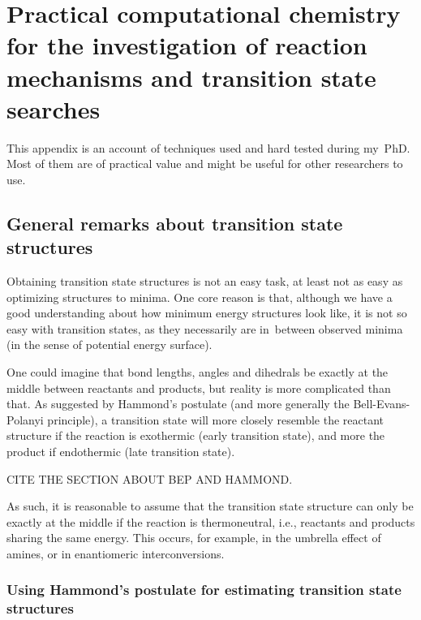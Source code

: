 \chapter{Practical computational chemistry for the investigation of reaction
  mechanisms and transition state searches}%
\label{ch:tutorial}


This appendix is an account of techniques used and hard tested during my~PhD.
Most of them are of practical value and might be useful for other researchers
to use.

\section{General remarks about transition state structures}

Obtaining transition state structures is not an easy task, at least not as easy
as optimizing structures to minima.
One core reason is that, although we have a good understanding about how
minimum energy structures look like, it is not so easy with transition states,
as they necessarily are in~between observed minima (in the sense of
potential energy surface).

One could imagine that bond lengths, angles and dihedrals be exactly at the
middle between reactants and products, but reality is more complicated than
that.
As suggested by Hammond's postulate (and more generally the Bell-Evans-Polanyi
principle), a transition state will more closely resemble the reactant
structure if the reaction is exothermic (early transition state), and more the
product if endothermic (late transition state).

CITE THE SECTION ABOUT BEP AND HAMMOND.\@

As such, it is reasonable to assume that the transition state structure can
only be exactly at the middle if the reaction is thermoneutral, i.e., reactants
and products sharing the same energy.
This occurs, for example, in the umbrella effect of amines, or in enantiomeric
interconversions.

\subsection{Using Hammond's postulate for estimating transition state
	structures}

